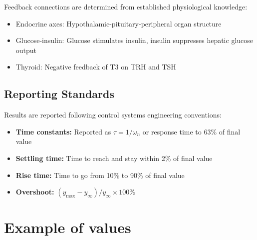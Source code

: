 \documentclass[
]{book}
\providecommand{\tightlist}{%
  \setlength{\itemsep}{0pt}\setlength{\parskip}{0pt}}
\begin{document}
Feedback connections are determined from established physiological knowledge:

\begin{itemize}
\tightlist
\item
  Endocrine axes: Hypothalamic-pituitary-peripheral organ structure
\item
  Glucose-insulin: Glucose stimulates insulin, insulin suppresses hepatic glucose output
\item
  Thyroid: Negative feedback of T3 on TRH and TSH
\end{itemize}

\section{Reporting Standards}\label{reporting-standards}

Results are reported following control systems engineering conventions:

\begin{itemize}
\tightlist
\item
  \textbf{Time constants:} Reported as \(\tau = 1/\omega_n\) or response time to 63\% of final value
\item
  \textbf{Settling time:} Time to reach and stay within 2\% of final value
\item
  \textbf{Rise time:} Time to go from 10\% to 90\% of final value
\item
  \textbf{Overshoot:} \((y_{\max} - y_{\infty}) / y_{\infty} \times 100\%\)
\end{itemize}

\chapter*{Example of values}\label{example-of-values}
\end{document}
